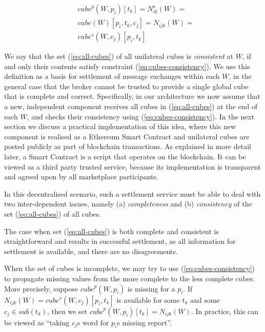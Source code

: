 \documentclass[chi_draft]{sigchi}
\begin{document}
{\begin{equation}\label{eq:cubes-consistency}
\begin{split}
& \mathit{cube}^p(W, p_i)[t_k] = N^s_{ik}(W) = \\
& \mathit{cube}(W)[p_i, t_k, c_j]  = N_{ijk}(W) = \\
& \mathit{cube^s}(W, c_j)[p_i, t_k]
\end{split}
\end{equation}

We say that the set (\ref{eq:all-cubes}) of all unilateral cubes is \textit{consistent} at $W$, if and only their contents satisfy constraint (\ref{eq:cubes-consistency}).
We use this definition as a basis for settlement of message exchanges within each $W$, in the general case that the broker cannot be trusted to provide a single global cube that is complete and correct.
%
Specifically, in our architecture we  now assume that a new, independent component receives all cubes in (\ref{eq:all-cubes}) at the end of each $W$, and checks their consistency using (\ref{eq:cubes-consistency}). 
In the next section we discuss a practical implementation of this idea, where this new component is realised as a Ethereum Smart Contract and unilateral cubes are posted publicly as part of blockchain transactions. As explained in more detail later, a Smart Contract is a script that operates on the blockchain.   
It can be viewed as a third party trusted service, because its implementation is transparent and agreed upon by all marketplace participants. 

In this decentralised scenario, such a settlement service must be able to deal with two inter-dependent issues, namely (a) \textit{completeness} and (b) \textit{consistency} of the set (\ref{eq:all-cubes}) of all cubes.

The case when set (\ref{eq:all-cubes}) is both complete and consistent is straightforward and results in successful settlement, as all information for settlement is available, and there are no disagreements.

When the set of cubes is incomplete, we may try to use (\ref{eq:cubes-consistency}) to propagate missing values from the more complete to the less complete cubes. 
More precisely, suppose $ \mathit{cube}^p(W, p_i) $ is missing for a $p_i$.
If $ N_{ijk}(W) = \mathit{cube^s}(W, c_j)[p_i, t_k] $ is available for some $t_k$ and some $ c_j \in \mathit{sub}(t_k) $, then we set $  \mathit{cube}^p(W, p_i)[t_k]=  N_{ijk}(W) $.
In practice, this can be viewed as ``taking $ c_j $s word for $p_i$s missing report''.

}
\end{document}
